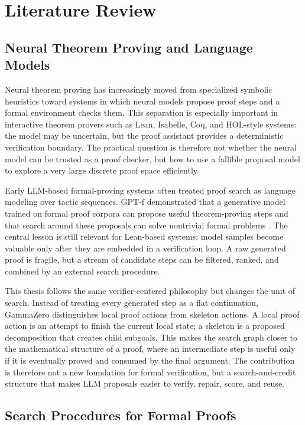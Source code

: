 \chapter{Literature Review}
\label{sec:literature}

\section{Neural Theorem Proving and Language Models}

Neural theorem proving has increasingly moved from specialized symbolic heuristics toward systems in
which neural models propose proof steps and a formal environment checks them. This separation is
especially important in interactive theorem provers such as Lean, Isabelle, Coq, and HOL-style systems:
the model may be uncertain, but the proof assistant provides a deterministic verification boundary.
The practical question is therefore not whether the neural model can be trusted as a proof checker, but
how to use a fallible proposal model to explore a very large discrete proof space efficiently.

Early LLM-based formal-proving systems often treated proof search as language modeling over tactic
sequences. GPT-f demonstrated that a generative model trained on formal proof corpora can propose
useful theorem-proving steps and that search around these proposals can solve nontrivial formal
problems \citep{polu2020gptf}. The central lesson is still relevant for Lean-based systems: model
samples become valuable only after they are embedded in a verification loop. A raw generated proof is
fragile, but a stream of candidate steps can be filtered, ranked, and combined by an external search
procedure.

This thesis follows the same verifier-centered philosophy but changes the unit of search. Instead of
treating every generated step as a flat continuation, GammaZero distinguishes local proof actions
from skeleton actions. A local proof action is an attempt to finish the current local state; a skeleton is a proposed
decomposition that creates child subgoals. This makes the search graph closer to the mathematical
structure of a proof, where an intermediate step is useful only if it is eventually proved and consumed
by the final argument. The contribution is therefore not a new foundation for formal verification, but a
search-and-credit structure that makes LLM proposals easier to verify, repair, score, and reuse.

\section{Search Procedures for Formal Proofs}

